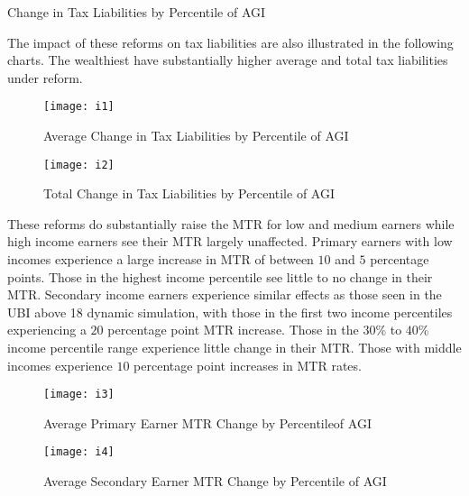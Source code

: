 \documentclass{article}
\begin{document}
\begin{table}[H]
\caption{Change in Tax Liabilities by Percentile of AGI}

\begin{center}
\begin{adjustbox}{max width=\textwidth}

\end{adjustbox}
\end{center}
\end{table}

The impact of these reforms on tax liabilities are also illustrated in the following charts. The wealthiest have substantially higher average and total tax liabilities under reform.

\begin{figure}[H]
\centering
\caption{Average Change in Tax Liabilities by Percentile of AGI}
\texttt{[image: i1]}
\end{figure}

\begin{figure}[H]
\centering
\caption{Total Change in Tax Liabilities by Percentile of AGI}
\texttt{[image: i2]}
\end{figure}

These reforms do substantially raise the MTR for low and medium earners while high income earners see their MTR largely unaffected.
Primary earners with low incomes experience a large increase in MTR of between $10$ and $5$ percentage points. Those in the highest income percentile see little to no change in their MTR. Secondary income earners experience similar effects as those seen in the UBI above 18 dynamic simulation, with those in the first two income percentiles experiencing a $20$ percentage point MTR increase. Those in the $30\%$ to $40\%$ income percentile range experience little change in their MTR. Those with middle incomes experience $10$ percentage point increases in MTR rates.

\begin{figure}[H]
\centering
\caption{Average Primary Earner MTR Change by Percentileof AGI}
\texttt{[image: i3]}
\end{figure}

\begin{figure}[H]
\centering
\caption{Average Secondary Earner MTR Change by Percentile of AGI}
\texttt{[image: i4]}
\end{figure}
\end{document}

